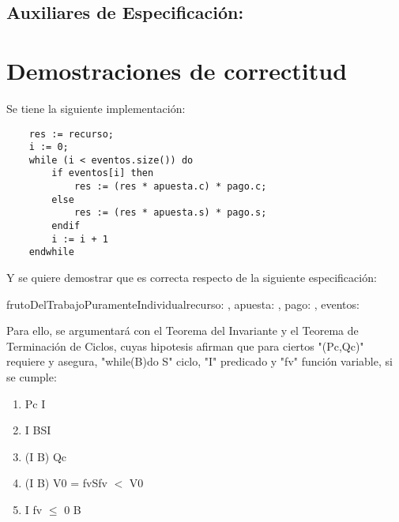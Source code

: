 \documentclass[10pt,a4paper]{article}
\begin{document}
\subsection{Auxiliares de Especificación:}

	{
	}

	{
	}
	{
	}

\section{Demostraciones de correctitud}

Se tiene la siguiente implementación:

\begin{lstlisting}
	res := recurso;
	i := 0;
	while (i < eventos.size()) do
		if eventos[i] then
			res := (res * apuesta.c) * pago.c;
		else
			res := (res * apuesta.s) * pago.s;
		endif
		i := i + 1
	endwhile
\end{lstlisting}

Y se quiere demostrar que es correcta respecto de la siguiente especificación:

\begin{proc}{frutoDelTrabajoPuramenteIndividual}{\In recurso: \float, \In apuesta: , \In pago: , \In eventos: \TLista{\bool} }{\float}



\end{proc}

Para ello, se argumentará con el Teorema del Invariante y el Teorema de Terminación de Ciclos, cuyas hipotesis afirman que
para ciertos "(Pc,Qc)" requiere y asegura, "while(B)do S" ciclo, "I" predicado y "fv" función variable, si se cumple:

\begin{enumerate} \setlength\itemsep{1cm}
	\item Pc \implica I

	\item {I \Y B}S{I}

	\item (I \Y \false B) \implica Qc %

	\item {(I \Y B) \Y V0 = fv}S{fv $<$ V0}

	\item I \Y fv $\leq$ 0 \implica \false B
\end{enumerate}
\end{document}
